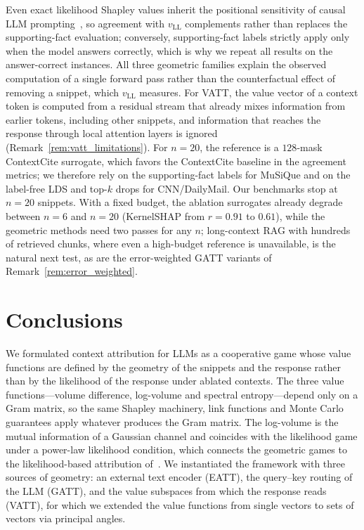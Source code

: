 Even exact likelihood Shapley values inherit the positional sensitivity of causal LLM prompting~\cite{liu2024lost}, so agreement with $v_{\text{LL}}$ complements rather than replaces the supporting-fact evaluation; conversely, supporting-fact labels strictly apply only when the model answers correctly, which is why we repeat all results on the answer-correct instances. All three geometric families explain the observed computation of a single forward pass rather than the counterfactual effect of removing a snippet, which $v_{\text{LL}}$ measures. For VATT, the value vector of a context token is computed from a residual stream that already mixes information from earlier tokens, including other snippets, and information that reaches the response through local attention layers is ignored (Remark~\ref{rem:vatt_limitations}). For $n = 20$, the reference is a $128$-mask ContextCite surrogate, which favors the ContextCite baseline in the agreement metrics; we therefore rely on the supporting-fact labels for MuSiQue and on the label-free LDS and top-$k$ drops for CNN/DailyMail. Our benchmarks stop at $n = 20$ snippets. With a fixed budget, the ablation surrogates already degrade between $n = 6$ and $n = 20$ (KernelSHAP from $r = 0.91$ to $0.61$), while the geometric methods need two passes for any $n$; long-context RAG with hundreds of retrieved chunks, where even a high-budget reference is unavailable, is the natural next test, as are the error-weighted GATT variants of Remark~\ref{rem:error_weighted}.

\section{Conclusions}
\label{sec:conclusions}

We formulated context attribution for LLMs as a cooperative game whose value functions are defined by the geometry of the snippets and the response rather than by the likelihood of the response under ablated contexts. The three value functions---volume difference, log-volume and spectral entropy---depend only on a Gram matrix, so the same Shapley machinery, link functions and Monte Carlo guarantees apply whatever produces the Gram matrix. The log-volume is the mutual information of a Gaussian channel and coincides with the likelihood game under a power-law likelihood condition, which connects the geometric games to the likelihood-based attribution of~\cite{nematov2025source}. We instantiated the framework with three sources of geometry: an external text encoder (EATT), the query--key routing of the LLM (GATT), and the value subspaces from which the response reads (VATT), for which we extended the value functions from single vectors to sets of vectors via principal angles.

